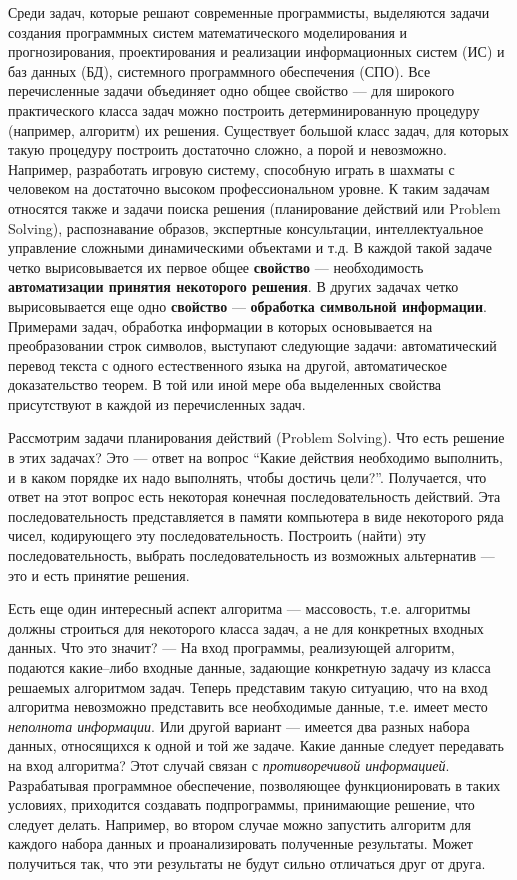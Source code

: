 \documentclass[12pt, openany, twoside]{book} %
\begin{document}
Среди задач, которые решают современные программисты, выделяются задачи создания программных систем математического моделирования и прогнозирования, проектирования и реализации информационных систем (ИС) и баз данных (БД), системного программного обеспечения (СПО). Все перечисленные задачи объединяет одно общее свойство --- для широкого практического класса задач можно построить детерминированную процедуру (например, алгоритм) их решения. Существует большой класс задач, для которых такую процедуру построить достаточно сложно, а порой и невозможно. Например, разработать игровую систему, способную играть в шахматы с человеком на достаточно высоком профессиональном уровне. К таким задачам относятся также и задачи поиска решения (планирование действий или Problem Sol\-ving), распознавание образов, экспертные консультации, интеллектуальное управление сложными динамическими объектами и т.д. В каждой такой задаче четко вырисовывается их первое общее {\bf свойство} --- необходимость {\bf автоматизации принятия некоторого решения}. В других задачах четко вырисовывается еще одно {\bf свойство} --- {\bf обработка символьной информации}. Примерами задач, обработка информации в которых основывается на преобразовании строк символов, выступают следующие задачи: автоматический перевод текста с одного естественного языка на другой, автоматическое доказательство теорем. В той или иной мере оба выделенных свойства присутствуют в каждой из перечисленных задач.

Рассмотрим задачи планирования действий (Problem Sol\-ving). Что есть решение в этих задачах? Это --- ответ на вопрос ``Какие действия необходимо выполнить, и в каком порядке их надо выполнять, чтобы достичь цели?''. Получается, что ответ на этот вопрос есть некоторая конечная последовательность действий. Эта последовательность представляется в памяти компьютера в виде некоторого ряда чисел, кодирующего эту последовательность. Построить (найти) эту последовательность, выбрать последовательность из возможных альтернатив --- это и есть принятие решения.

Есть еще один интересный аспект алгоритма --- массовость, т.е. алгоритмы должны строиться для некоторого класса задач, а не для конкретных входных данных. Что это значит? --- На вход программы, реализующей алгоритм, подаются какие--либо входные данные, задающие конкретную задачу из класса решаемых алгоритмом задач. Теперь представим такую ситуацию, что на вход алгоритма невозможно представить все необходимые данные, т.е. имеет место \emph{неполнота информации}. Или другой вариант --- имеется два разных набора данных, относящихся к одной и той же задаче. Какие данные следует передавать на вход алгоритма? Этот случай связан с \emph{противоречивой информацией}. Разрабатывая программное обеспечение, позволяющее функционировать в таких условиях, приходится создавать подпрограммы, принимающие решение, что следует делать. Например, во втором случае можно запустить алгоритм для каждого набора данных и проанализировать полученные результаты. Может получиться так, что эти результаты не будут сильно отличаться друг от друга.
\end{document}
